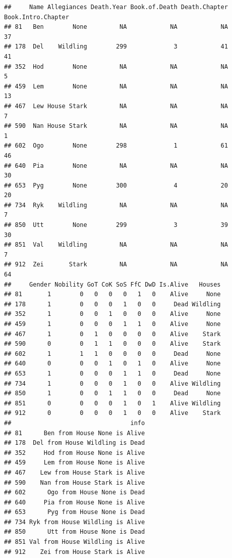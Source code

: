 \documentclass[]{book}
\begin{document}
\begin{verbatim}
##     Name Allegiances Death.Year Book.of.Death Death.Chapter Book.Intro.Chapter
## 81   Ben        None         NA            NA            NA                 37
## 178  Del    Wildling        299             3            41                 41
## 352  Hod        None         NA            NA            NA                  5
## 459  Lem        None         NA            NA            NA                 13
## 467  Lew House Stark         NA            NA            NA                  7
## 590  Nan House Stark         NA            NA            NA                  1
## 602  Ogo        None        298             1            61                 46
## 640  Pia        None         NA            NA            NA                 30
## 653  Pyg        None        300             4            20                 20
## 734  Ryk    Wildling         NA            NA            NA                  7
## 850  Utt        None        299             3            39                 30
## 851  Val    Wildling         NA            NA            NA                  7
## 912  Zei       Stark         NA            NA            NA                 64
##     Gender Nobility GoT CoK SoS FfC DwD Is.Alive   Houses
## 81       1        0   0   0   0   1   0    Alive     None
## 178      1        0   0   0   1   0   0     Dead Wildling
## 352      1        0   0   1   0   0   0    Alive     None
## 459      1        0   0   0   1   1   0    Alive     None
## 467      1        0   1   0   0   0   0    Alive    Stark
## 590      0        0   1   1   0   0   0    Alive    Stark
## 602      1        1   1   0   0   0   0     Dead     None
## 640      0        0   0   1   0   1   0    Alive     None
## 653      1        0   0   0   1   1   0     Dead     None
## 734      1        0   0   0   1   0   0    Alive Wildling
## 850      1        0   0   1   1   0   0     Dead     None
## 851      0        0   0   0   1   0   1    Alive Wildling
## 912      0        0   0   0   1   0   0    Alive    Stark
##                                 info
## 81      Ben from House None is Alive
## 178  Del from House Wildling is Dead
## 352     Hod from House None is Alive
## 459     Lem from House None is Alive
## 467    Lew from House Stark is Alive
## 590    Nan from House Stark is Alive
## 602      Ogo from House None is Dead
## 640     Pia from House None is Alive
## 653      Pyg from House None is Dead
## 734 Ryk from House Wildling is Alive
## 850      Utt from House None is Dead
## 851 Val from House Wildling is Alive
## 912    Zei from House Stark is Alive
\end{verbatim}
\end{document}
